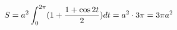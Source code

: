 \documentclass[preview]{standalone}
\begin{document}
\begin{align*}
\special{dvisvgm:raw <g id='unique000'>}S = a^2 \int_{0}^{2\pi} (1 + \frac{1+\cos 2t}{2}) dt = a^2 \cdot 3\pi = 3\pi a^2\special{dvisvgm:raw </g>}
\end{align*}
\end{document}
